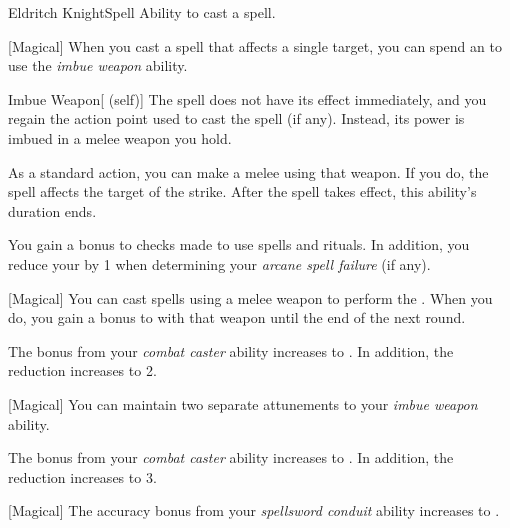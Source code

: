     \begin{feat}{Eldritch Knight}{Spell}
        \featpre Ability to cast a spell.

        [Magical] When you cast a spell that affects a single target, you can spend an  to use the \textit{imbue weapon} ability.
        \begin{ability}{Imbue Weapon}[ (self)]
            The spell does not have its effect immediately, and you regain the action point used to cast the spell (if any).
            Instead, its power is imbued in a melee weapon you hold. 

            As a standard action, you can make a melee  using that weapon.
            If you do, the spell affects the target of the strike.
            After the spell takes effect, this ability's duration ends.
        \end{ability}

         You gain a  bonus to  checks made to use spells and rituals.
        In addition, you reduce your  by 1 when determining your \textit{arcane spell failure} (if any).

        [Magical] You can cast spells using a melee weapon to perform the .
        When you do, you gain a  bonus to  with that weapon until the end of the next round.

         The  bonus from your \textit{combat caster} ability increases to .
        In addition, the  reduction increases to 2.

        [Magical] You can maintain two separate attunements to your \textit{imbue weapon} ability.

         The  bonus from your \textit{combat caster} ability increases to .
        In addition, the  reduction increases to 3.

        [Magical] The accuracy bonus from your \textit{spellsword conduit} ability increases to .
    \end{feat}

